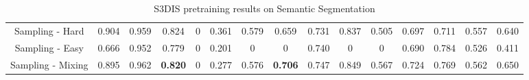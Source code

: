 \documentclass[12pt]{article}
\begin{document}
\begin{center}
\begin{table}[h!]
{\begin{tabular}{ c | c c c c c c c c c c c c c | c }
                \hline
                Sampling - Hard   & 0.904          & 0.959          & 0.824          & 0              & 0.361          & 0.579          & 0.659          & 0.731          & 0.837          & 0.505          & 0.697          & 0.711          & 0.557          & 0.640          \\
                Sampling - Easy   & 0.666          & 0.952          & 0.779          & 0              & 0.201          & 0              & 0              & 0.740          & 0              & 0              & 0.690          & 0.784          & 0.526          & 0.411          \\
                Sampling - Mixing & 0.895          & 0.962          & \textbf{0.820} & 0              & 0.277          & 0.576          & \textbf{0.706} & 0.747          & 0.849          & 0.567          & 0.724          & 0.769          & 0.562          & 0.650          \\
            \end{tabular}
        }
        \caption{S3DIS pretraining results on Semantic Segmentation}
    \end{table}
\end{center}


\pagebreak

\newpage


\end{document}

